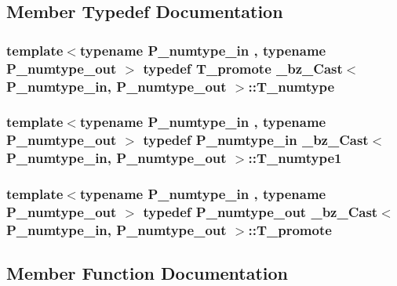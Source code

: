 \subsection{Member Typedef Documentation}
\hypertarget{class__bz__Cast_a3fcb75e5ad757ce3555f4297cd09ec5e}{}
\subsubsection[{T\+\_\+numtype}]{\setlength{\rightskip}{0pt plus 5cm}template$<$typename P\+\_\+numtype\+\_\+in , typename P\+\_\+numtype\+\_\+out $>$ typedef {\bf T\+\_\+promote} {\bf \+\_\+bz\+\_\+\+Cast}$<$ P\+\_\+numtype\+\_\+in, P\+\_\+numtype\+\_\+out $>$\+::{\bf T\+\_\+numtype}}\label{class__bz__Cast_a3fcb75e5ad757ce3555f4297cd09ec5e}
\hypertarget{class__bz__Cast_af1ac85e98c97ab910c25a2dab0e0bf93}{}
\subsubsection[{T\+\_\+numtype1}]{\setlength{\rightskip}{0pt plus 5cm}template$<$typename P\+\_\+numtype\+\_\+in , typename P\+\_\+numtype\+\_\+out $>$ typedef P\+\_\+numtype\+\_\+in {\bf \+\_\+bz\+\_\+\+Cast}$<$ P\+\_\+numtype\+\_\+in, P\+\_\+numtype\+\_\+out $>$\+::{\bf T\+\_\+numtype1}}\label{class__bz__Cast_af1ac85e98c97ab910c25a2dab0e0bf93}
\hypertarget{class__bz__Cast_a5111855b9362d0e6750d0f88a3ec6d8e}{}
\subsubsection[{T\+\_\+promote}]{\setlength{\rightskip}{0pt plus 5cm}template$<$typename P\+\_\+numtype\+\_\+in , typename P\+\_\+numtype\+\_\+out $>$ typedef P\+\_\+numtype\+\_\+out {\bf \+\_\+bz\+\_\+\+Cast}$<$ P\+\_\+numtype\+\_\+in, P\+\_\+numtype\+\_\+out $>$\+::{\bf T\+\_\+promote}}\label{class__bz__Cast_a5111855b9362d0e6750d0f88a3ec6d8e}


\subsection{Member Function Documentation}
\hypertarget{class__bz__Cast_acc98ba5b4f2446e707037c4168841495}{}
